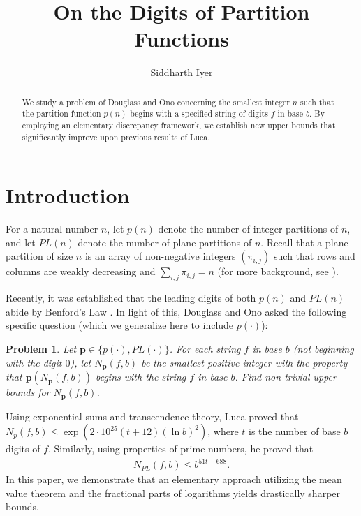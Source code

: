\documentclass[12pt]{amsart}
\numberwithin{equation}{section}
\newtheorem{prob}[thm]{Problem}
\begin{document}
\title[Digits of partition functions]
{On the Digits of Partition Functions}

\author[Siddharth Iyer] {Siddharth Iyer}
\address{School of Mathematics and Statistics, University of New South Wales, Sydney, NSW 2052, Australia}

\begin{abstract}
We study a problem of Douglass and Ono concerning the smallest integer $n$ such that the partition function $p(n)$ begins with a specified string of digits $f$ in base $b$. By employing an elementary discrepancy framework, we establish new upper bounds that significantly improve upon previous results of Luca.
\end{abstract}


\maketitle

\section{Introduction}
For a natural number $n$, let $p(n)$ denote the number of integer partitions of $n$, and let $PL(n)$ denote the number of plane partitions of $n$. Recall that a plane partition of size $n$ is an array of non-negative integers $(\pi_{i,j})$ such that rows and columns are weakly decreasing and $\sum_{i,j} \pi_{i,j} = n$ (for more background, see \cite{Andrews}). 

Recently, it was established that the leading digits of both $p(n)$ and $PL(n)$ abide by Benford's Law \cite{Anderson, Ono}. In light of this, Douglass and Ono \cite{Ono} asked the following specific question (which we generalize here to include $p(\cdot)$):

\begin{prob}
Let $\mathbf{p} \in \{p(\cdot), PL(\cdot)\}$. For each string $f$ in base $b$ (not beginning with the digit $0$), let $N_{\mathbf{p}}(f,b)$ be the smallest positive integer with the property that $\mathbf{p}(N_{\mathbf{p}}(f,b))$ begins with the string $f$ in base $b$. Find non-trivial upper bounds for $N_{\mathbf{p}}(f,b)$.
\end{prob}

Using exponential sums and transcendence theory, Luca \cite{LucaPart2} proved that $N_{p}(f,b) \leq \exp(2\cdot 10^{25}(t+12)(\ln b)^2)$, where $t$ is the number of base $b$ digits of $f$. Similarly, using properties of prime numbers, he proved that \cite{LucaPart1}
\begin{align*}
N_{PL}(f,b) \leq b^{51t+688}.
\end{align*}
In this paper, we demonstrate that an elementary approach utilizing the mean value theorem and the fractional parts of logarithms yields drastically sharper bounds.
\end{document}
